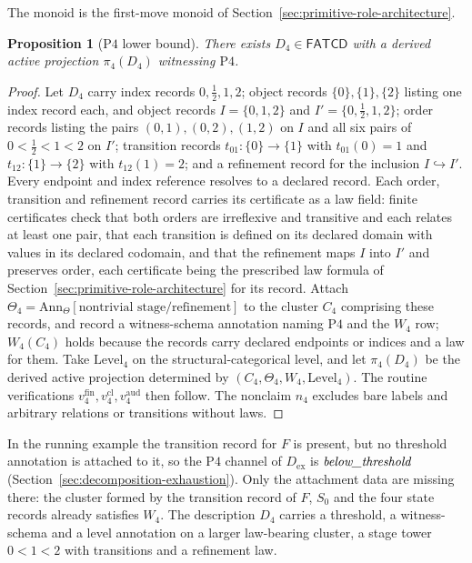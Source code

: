 \documentclass[11pt]{article}
\newtheorem{proposition}[theorem]{Proposition}
\theoremstyle{definition}
\newcommand{\FATCD}{\ensuremath{\mathsf{FATCD}}}
\newcommand{\belowthr}{\textit{below\_\allowbreak threshold}}
\newcommand{\Pfour}{\ensuremath{\mathrm{P4}}}
\begin{document}
The monoid is the first-move monoid of
Section~\ref{sec:primitive-role-architecture}.

\begin{proposition}[\Pfour{} lower bound]\label{prop:p4-witness}
There exists \(D_4 \in \FATCD{}\) with a derived active projection
\(\pi_4(D_4)\) witnessing \Pfour{}.
\end{proposition}

\begin{proof}
Let \(D_4\) carry index records \(0,\tfrac12,1,2\); object records
\(\{0\},\{1\},\{2\}\) listing one index record each, and object records
\(I=\{0,1,2\}\) and \(I'=\{0,\tfrac12,1,2\}\); order records listing the pairs \((0,1),(0,2),(1,2)\)
on \(I\) and all six pairs of \(0<\tfrac12<1<2\) on \(I'\); transition records
\(t_{01}:\{0\}\to\{1\}\) with \(t_{01}(0)=1\) and \(t_{12}:\{1\}\to\{2\}\) with
\(t_{12}(1)=2\); and a refinement record
for the inclusion \(I\hookrightarrow I'\).
Every endpoint and index reference resolves to a declared record. Each
order, transition and refinement record carries its certificate as a law
field: finite certificates check that both orders are irreflexive and
transitive and each relates at least one pair, that each transition is defined on its declared domain with values
in its declared codomain, and that the refinement maps \(I\) into \(I'\) and preserves order, each certificate being the prescribed law formula of Section~\ref{sec:primitive-role-architecture} for its record. Attach
\(\Theta_4=\mathrm{Ann}_\Theta[\text{nontrivial stage/refinement}]\)
to the cluster \(C_4\) comprising these records, and record a
witness-schema annotation naming \Pfour{} and the \(W_4\) row; \(W_4(C_4)\)
holds because the records carry declared endpoints or indices and a law for
them. Take
\(\mathrm{Level}_4\) on the structural-categorical level, and let
\(\pi_4(D_4)\) be the derived active projection determined by
\((C_4,\Theta_4,W_4,\mathrm{Level}_4)\). The routine verifications
\(v_4^{\mathrm{fin}}, v_4^{\mathrm{cl}}, v_4^{\mathrm{aud}}\) then
follow. The nonclaim \(n_4\) excludes bare labels and arbitrary
relations or transitions without laws.
\end{proof}

In the running example the transition record for \(F\) is present, but no
threshold annotation is attached to it, so the \Pfour{} channel of
\(D_{\mathrm{ex}}\) is \(\belowthr\) (Section~\ref{sec:decomposition-exhaustion}).
Only the attachment data are missing there: the cluster formed by the transition
record of \(F\), \(S_0\) and the four state records already satisfies \(W_4\). The description \(D_4\) carries a threshold, a
witness-schema and a level annotation on a larger law-bearing cluster, a stage
tower \(0<1<2\) with transitions and a refinement law.
\end{document}
